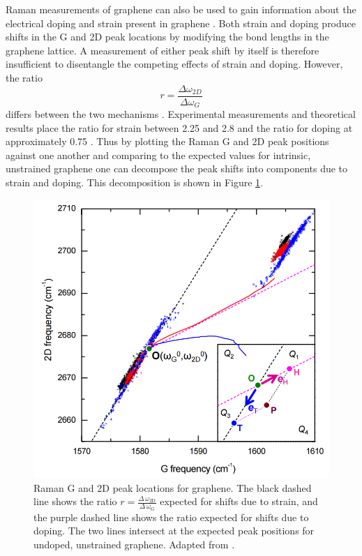 \documentclass[edeposit,fullpage,draftthesis]{uiucthesis2009}
\begin{document}
        Raman measurements of graphene can also be used to gain information about the electrical doping
        and strain present in graphene \cite{lee2012optical}. Both strain and doping produce shifts
        in the G and 2D peak locations by modifying the bond lengths in the graphene lattice. 
        A measurement of either peak shift by itself is therefore insufficient to disentangle the competing effects
        of strain and doping. However, the ratio
        $$
        r = \frac{\Delta \omega_{2D}}{\Delta \omega_G}
        $$
        differs between the two mechanisms \cite{lee2012optical}.
        Experimental measurements \cite{zabel2012raman, metzger2009biaxial, ding2010stretchable} and theoretical \cite{mohr2010splitting, mohiuddin2009uniaxial} results place the ratio for strain between 2.25 and 2.8 and the ratio for doping at approximately 0.75 \cite{lee2012optical}.
        Thus by plotting the Raman G and 2D peak positions against one another and comparing to the expected
        values for intrinsic, unstrained graphene one can decompose the peak shifts into components due to
        strain and doping\cite{lee2012optical}. This decomposition is shown in Figure \ref{fig:raman_decomposition}.
        
        \begin{figure}
            \centering
            \includegraphics[width=0.5\linewidth]{images/experimentaltechniques/lee2012_raman.png}
            \caption[Graphene G vs 2D peak positions for strain and doping]{
                Raman G and 2D peak locations for graphene.
                The black dashed line shows the ratio 
                $r = \frac{\Delta \, \omega_\text{2D}}{\Delta \, \omega_\text{G}}$ expected for shifts due to
                strain, and the purple dashed line shows the ratio expected for shifts due to doping.
                The two lines intersect at the expected peak positions for undoped, unstrained graphene.
                Adapted from \cite{lee2012optical}.
                }
            \label{fig:raman_decomposition}
        \end{figure}
        
\end{document}

